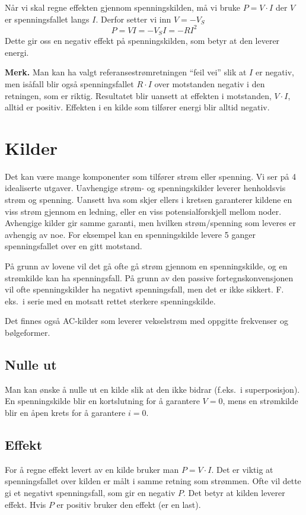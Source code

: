 \documentclass[12pt,a4paper,norsk]{article}
\begin{document}
Når vi skal regne effekten gjennom spenningskilden, må vi bruke $P = V \cdot
I$ der $V$ er spenningsfallet langs $I$. Derfor setter vi inn $V = -V_S$
\[P = VI = -V_SI = -RI^2\]
Dette gir oss en negativ effekt på spenningskilden, som betyr at den leverer energi.

\textbf{Merk.} Man kan ha valgt referansestrømretningen ``feil vei'' slik at $I$
er negativ, men isåfall blir også spenningsfallet $R \cdot I$ over motstanden
negativ i den retningen, som er riktig. Resultatet blir uansett at effekten i
motstanden, $V \cdot I$, alltid er positiv. Effekten i en kilde som tilfører energi
blir alltid negativ.

\section{Kilder}
Det kan være mange komponenter som tilfører strøm eller spenning. Vi ser på 4
idealiserte utgaver. Uavhengige strøm- og spenningskilder leverer henholdsvis
strøm og spenning. Uansett hva som skjer ellers i kretsen garanterer kildene en
viss strøm gjennom en ledning, eller en viss potensialforskjell mellom noder.
Avhengige kilder gir samme garanti, men hvilken strøm/spenning som leveres er
avhengig av noe. For eksempel kan en spenningskilde levere 5 ganger
spenningsfallet over en gitt motstand.

På grunn av lovene vil det gå ofte gå strøm gjennom en spenningskilde, og en strømkilde
kan ha spenningsfall. På grunn av den passive fortegnskonvensjonen
vil ofte spenningskilder ha negativt spenningsfall, men det er ikke sikkert. F.
eks.\ i serie med en motsatt rettet sterkere spenningskilde.

Det finnes også AC-kilder som leverer vekselstrøm med oppgitte frekvenser og bølgeformer.

\subsection{Nulle ut}
Man kan ønske å nulle ut en kilde slik at den ikke bidrar (f.eks.\ i
superposisjon). En spenningskilde blir en kortslutning for å garantere $V=0$,
mens en strømkilde blir en åpen krets for å garantere $i=0$.

\subsection{Effekt}
For å regne effekt levert av en kilde bruker man $P = V \cdot I$. Det er viktig at
spenningsfallet over kilden er målt i samme retning som strømmen. Ofte vil dette gi et
negativt spenningsfall, som gir en negativ $P$. Det betyr at kilden leverer
effekt. Hvis $P$ er positiv bruker den effekt (er en last).
\end{document}
